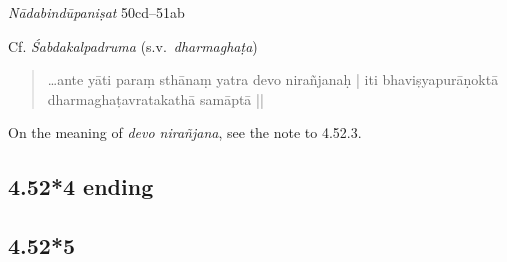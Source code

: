 \begin{ekdosis}
\begin{testimonia}[hp04_052_4]
\emph{Nādabindūpaniṣat} 50cd--51ab
\begin{versinnote}
\end{versinnote}

Cf. \emph{Śabdakalpadruma} (s.v.~\emph{dharmaghaṭa})
\begin{quote}
\dots ante yāti paraṃ sthānaṃ yatra devo nirañjanaḥ |
iti bhaviṣyapurāṇoktā dharmaghaṭavratakathā samāptā ||
\end{quote}
\end{testimonia}

\begin{philcomm}[hp04_052_4]
On the meaning of \emph{devo nirañjana}, see the note to 4.52.3.

\end{philcomm}

\subsection*{4.52*4 ending}
\begin{translation}[hp04_052_4p]
\end{translation}



\subsection*{4.52*5}




\end{ekdosis}
